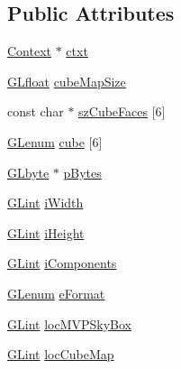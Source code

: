 \subsection*{Public Attributes}
\begin{DoxyCompactItemize}
\item 
\hyperlink{class_context}{Context} $\ast$ \hyperlink{class_cube_map_a37eeec01f385c159dd652b7cff226ab4}{ctxt}
\item 
\hyperlink{_g_l_e_w_2glew_8h_a4a966015c733cb5fe2733de64a62a3a5}{G\-Lfloat} \hyperlink{class_cube_map_a5f81bc369363527e34b462012cbdedc7}{cube\-Map\-Size}
\item 
const char $\ast$ \hyperlink{class_cube_map_a9174fa6b7453790a52d6a5e3fc72807b}{sz\-Cube\-Faces} \mbox{[}6\mbox{]}
\item 
\hyperlink{_g_l_e_w_2glew_8h_a5d5233918a454ad3975c620a69ac5f0b}{G\-Lenum} \hyperlink{class_cube_map_a09b48ee002d41d837644b184ad75a90a}{cube} \mbox{[}6\mbox{]}
\item 
\hyperlink{_g_l_e_w_2glew_8h_a0a9e8b1f1d9c4bcf1c0bc5d5d4e3608a}{G\-Lbyte} $\ast$ \hyperlink{class_cube_map_aaede2138131291660c5758634f15adec}{p\-Bytes}
\item 
\hyperlink{_g_l_e_w_2glew_8h_acebcc1c5663f14ebde1d16831e5fed94}{G\-Lint} \hyperlink{class_cube_map_abc8fae6477d92d7a974f7d924aa932fc}{i\-Width}
\item 
\hyperlink{_g_l_e_w_2glew_8h_acebcc1c5663f14ebde1d16831e5fed94}{G\-Lint} \hyperlink{class_cube_map_a3eb7318d91d9790719dccfba29d80339}{i\-Height}
\item 
\hyperlink{_g_l_e_w_2glew_8h_acebcc1c5663f14ebde1d16831e5fed94}{G\-Lint} \hyperlink{class_cube_map_a1c8ecc664fe6e56659aff49dfb24fa2a}{i\-Components}
\item 
\hyperlink{_g_l_e_w_2glew_8h_a5d5233918a454ad3975c620a69ac5f0b}{G\-Lenum} \hyperlink{class_cube_map_a44d26ee234cbd099bd9d39530fc6fa5d}{e\-Format}
\item 
\hyperlink{_g_l_e_w_2glew_8h_acebcc1c5663f14ebde1d16831e5fed94}{G\-Lint} \hyperlink{class_cube_map_a112ed4032bed21e59f649eb28d99a72f}{loc\-M\-V\-P\-Sky\-Box}
\item 
\hyperlink{_g_l_e_w_2glew_8h_acebcc1c5663f14ebde1d16831e5fed94}{G\-Lint} \hyperlink{class_cube_map_aba9d6a9c7f818edba9bd19611d3b2fdc}{loc\-Cube\-Map}
\end{DoxyCompactItemize}


